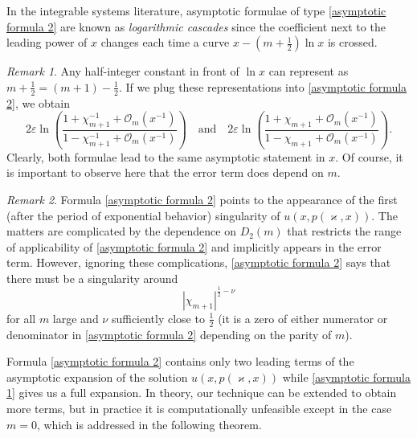 \documentclass[a4paper,10pt,leqno]{amsart}
\numberwithin{equation}{subsection}
\theoremstyle{plain}
\theoremstyle{definition}
\theoremstyle{remark}
\newtheorem*{rem}{Remark}
\theoremstyle{case}
\renewcommand{\O}{\mathcal{O}}
\begin{document}
In the integrable systems literature, asymptotic formulae of type \eqref{asymptotic formula 2} are known as {\it logarithmic cascades} since the coefficient next to the leading power of \( x \) changes each time a curve \( x-(m+\frac12)\ln x\) is crossed.

\begin{tcolorbox}[colback=white,colframe=gray]
\begin{rem}
Any half-integer constant in front of \( \ln x \) can represent as \( m+\tfrac12 = (m+1)-\tfrac12\). If we plug these representations into \eqref{asymptotic formula 2}, we obtain
\[
2\varepsilon \ln\left( \frac{1 + \chi_{m+1}^{-1} + \O_m(x^{-1})}{1 - \chi_{m+1}^{-1} + \O_m(x^{-1})} \right) \quad \text{and} \quad 2\varepsilon \ln\left( \frac{1 + \chi_{m+1} + \O_m(x^{-1})}{1 -\chi_{m+1} + \O_m(x^{-1})} \right).
\]
Clearly, both formulae lead to the same asymptotic statement in \( x \). Of course, it is important to observe here that the error term does depend on \( m \).
\end{rem}
\end{tcolorbox}

\begin{tcolorbox}[colback=white,colframe=gray]
\begin{rem}
Formula \eqref{asymptotic formula 2} points to the appearance of the first (after the period of exponential behavior) singularity of \( u(x,p(\varkappa,x)) \). The matters are complicated by the dependence on \( D_2(m) \) that restricts the range of applicability of \eqref{asymptotic formula 2} and implicitly appears in the error term. However, ignoring these complications, \eqref{asymptotic formula 2} says that there must be a singularity around
\[ 
|\chi_{m+1}|^{\frac12-\nu}
\]
for all \( m \) large and \( \nu \) sufficiently close to \( \frac12\) (it is a zero of either numerator or denominator in \eqref{asymptotic formula 2} depending on the parity of \( m \)).
\end{rem}
\end{tcolorbox}

Formula \eqref{asymptotic formula 2} contains only two leading terms of the asymptotic expansion of the solution \( u(x,p(\varkappa,x))\) while \eqref{asymptotic formula 1} gives us a full expansion. In theory, our technique can be extended to obtain more terms, but in practice it is computationally unfeasible except in the case \( m=0 \), which is addressed in the following theorem.
\end{document}
